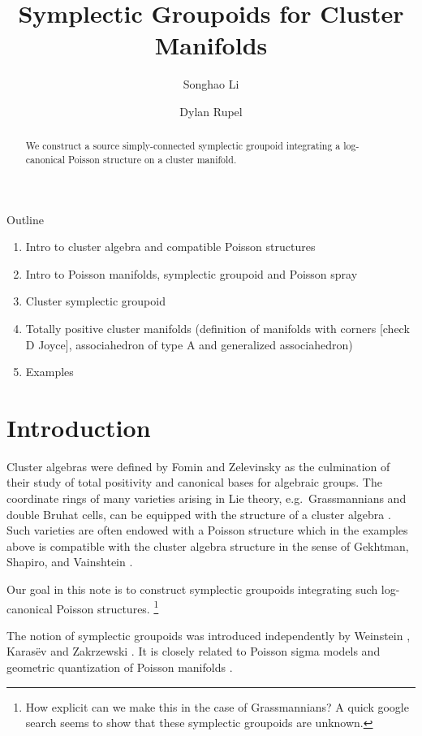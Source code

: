 \documentclass{amsart}
\title{Symplectic Groupoids for Cluster Manifolds}
\author{Songhao Li}
\author{Dylan Rupel}
\begin{document}
\begin{abstract}
  We construct a source simply-connected symplectic groupoid integrating a log-canonical Poisson structure on a cluster manifold.
\end{abstract}
\maketitle
Outline
\begin{enumerate}
	\item Intro to cluster algebra and compatible Poisson structures 
	\item Intro to Poisson manifolds, symplectic groupoid and Poisson spray
	\item Cluster symplectic groupoid
	\item Totally positive cluster manifolds (definition of manifolds with corners [check D Joyce], associahedron of type A and generalized associahedron)
	\item Examples
\end{enumerate}

\section{Introduction}
Cluster algebras were defined by Fomin and Zelevinsky \cite{fomin-zelevinsky1} as the culmination of their study of total positivity and canonical bases for algebraic groups.
The coordinate rings of many varieties arising in Lie theory, e.g.\ Grassmannians and double Bruhat cells, can be equipped with the structure of a cluster algebra \cite{berenstein-fomin-zelevinsky,scott,gekhtman-shapiro-vainshtein,williams}.
Such varieties are often endowed with a Poisson structure which in the examples above is compatible with the cluster algebra structure in the sense of Gekhtman, Shapiro, and Vainshtein \cite{gsv}.

Our goal in this note is to construct symplectic groupoids integrating such log-canonical Poisson structures.
\footnote{How explicit can we make this in the case of Grassmannians?  A quick google search seems to show that these symplectic groupoids are unknown.}

The notion of symplectic groupoids was introduced independently by Weinstein \cite{MR866024}, Karas\"{e}v \cite{MR1008479} and Zakrzewski \cite{MR1081010, MR1081011}. It is closely related to Poisson sigma models \cite{MR1938552} and geometric quantization of Poisson manifolds \cite{MR2417440, MR2925830}.
\end{document}
